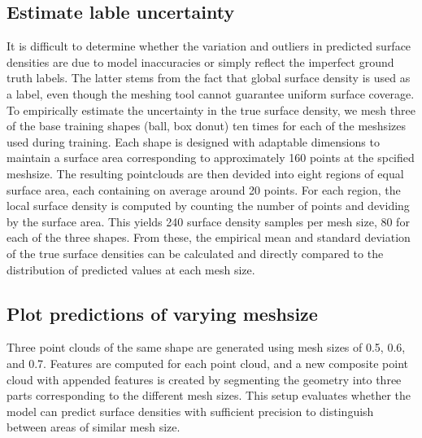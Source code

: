 \subsection*{Estimate lable uncertainty}
It is difficult to determine whether the variation and outliers in predicted surface densities are due to model inaccuracies or simply reflect the imperfect ground truth labels. The latter stems from the fact that global surface density is used as a label, even though the meshing tool cannot guarantee uniform surface coverage.
To empirically estimate the uncertainty in the true surface density, we mesh three of the base training shapes (ball, box donut) ten times for each of the meshsizes used during training. Each shape is designed with adaptable dimensions to maintain a surface area corresponding to approximately 160 points at the spcified meshsize. The resulting pointclouds are then devided into eight regions of equal surface area, each containing on average around 20 points. For each region, the local surface density is computed by counting the number of points and deviding by the surface area. This yields 240 surface density samples per mesh size, 80 for each of the three shapes. From these, the empirical mean and standard deviation of the true surface densities can be calculated and directly compared to the distribution of predicted values at each mesh size.

\subsection*{Plot predictions of varying meshsize}
Three point clouds of the same shape are generated using mesh sizes of 0.5, 0.6, and 0.7. Features are computed for each point cloud, and a new composite point cloud with appended features is created by segmenting the geometry into three parts corresponding to the different mesh sizes. This setup evaluates whether the model can predict surface densities with sufficient precision to distinguish between areas of similar mesh size.